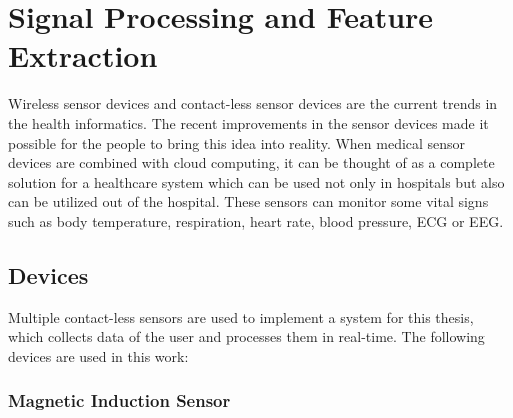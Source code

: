 \chapter{Signal Processing and Feature Extraction}

Wireless sensor devices and contact-less sensor devices are the current trends in the health informatics. The recent improvements in the sensor devices made it possible for the people to bring this idea
into reality. When medical sensor devices are combined with cloud computing, it can be thought of as a complete
solution for a healthcare system which can be used not only
in hospitals but also can be utilized out of the hospital.
These sensors can monitor some vital signs such as body temperature, respiration, heart rate, blood pressure, ECG or EEG.

\section{Devices}

Multiple contact-less sensors are used to implement a system for this thesis, which collects data of the user and processes them in real-time. The following devices are used in this work:

\subsection{Magnetic Induction Sensor}

